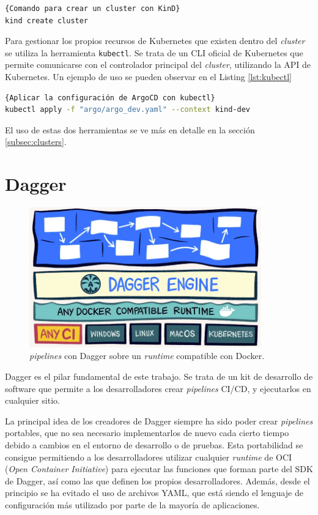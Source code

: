 \begin{lstlisting}[language=bash,label=lst:kindcc]{Comando para crear un cluster con KinD}
kind create cluster
\end{lstlisting}

Para gestionar los propios recursos de Kubernetes que existen dentro del \textit{cluster} se utiliza la herramienta \texttt{kubectl}\cite{kubectl}. Se trata de un CLI oficial de Kubernetes que permite comunicarse con el controlador principal del \textit{cluster}, utilizando la API de Kubernetes. Un ejemplo de uso se pueden observar en el Listing \ref{lst:kubectl}

\begin{lstlisting}[language=bash,label=lst:kubectl]{Aplicar la configuración de ArgoCD con kubectl}
kubectl apply -f "argo/argo_dev.yaml" --context kind-dev
\end{lstlisting}

El uso de estas dos herramientas se ve más en detalle en la sección \ref{subsec:clusters}.

\section{Dagger}

\begin{figure}
  \centerline{\includegraphics[width=10cm]{figuras/dagger}}
  \caption{\textit{pipelines} con Dagger sobre un \textit{runtime} compatible con Docker.\cite{img:dagger}}
  \label{fig:dagger}
\end{figure}

Dagger es el pilar fundamental de este trabajo. Se trata de un kit de desarrollo de software que permite a los desarrolladores crear \textit{pipelines} CI/CD, y ejecutarlos en cualquier sitio.

La principal idea de los creadores de Dagger siempre ha sido poder crear \textit{pipelines} portables, que no sea necesario implementarlos de nuevo cada cierto tiempo debido a cambios en el entorno de desarrollo o de pruebas. Esta portabilidad se consigue permitiendo a los desarrolladores utilizar cualquier \textit{runtime} de OCI (\textit{Open Container Initiative}\cite{oci}) para ejecutar las funciones que forman parte del SDK\cite{sdk} de Dagger, así como las que definen los propios desarrolladores. Además, desde el principio se ha evitado el uso de archivos YAML, que está siendo el lenguaje de configuración más utilizado por parte de la mayoría de aplicaciones.

